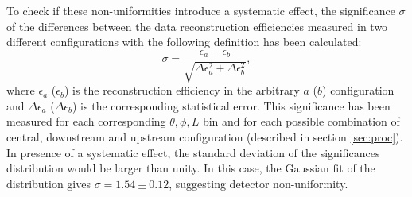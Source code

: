 \documentclass[a4paper,11pt]{article}
\begin{document}
To check if these non-uniformities introduce a systematic effect, the significance $\sigma$ of the differences between the data reconstruction efficiencies measured in two different configurations with the following definition has been calculated:
\begin{equation}
\sigma = \frac{\epsilon_a-\epsilon_b}{\sqrt{\Delta \epsilon_{a}^2 + \Delta \epsilon_b^2}},
\end{equation}
where $\epsilon_{a}$ ($\epsilon_{b}$) is the reconstruction efficiency in the arbitrary $a$ ($b$) configuration and $\Delta \epsilon_{a}$ ($\Delta \epsilon_{b}$) is the corresponding statistical error. This significance has been measured for each corresponding $\theta,\phi,L$ bin and for each possible combination of central, downstream and upstream configuration (described in section \ref{sec:proc}). In presence of a systematic effect, the standard deviation of the significances distribution would be larger than unity. In this case, the Gaussian fit of the distribution gives $\sigma = 1.54\pm0.12$, suggesting detector non-uniformity.


\end{document}
